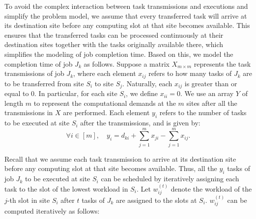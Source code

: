 To avoid the complex interaction between task transmissions and executions and simplify the problem model, we assume that every transferred task will arrive at its destination site before any computing slot at that site becomes available. %
This ensures that the transferred tasks can be processed continuously at their destination sites together with the tasks originally available there, which simplifies the modeling of job completion time. Based on this, we model the completion time of job $J_k$ as follows. Suppose a matrix $X_{m \times m}$ represents the task transmissions of job $J_k$, where each element $x_{ij}$ refers to how many tasks of $J_k$ are to be transferred from site $S_i$ to site $S_j$. Naturally, each $x_{ij}$ is greater than or equal to $0$. In particular, for each site $S_i$, we define $x_{ii}=0$. We use an array $Y$ of length $m$ to represent the computational demands at the $m$ sites after all the transmissions in $X$ are performed. Each element $y_i$ refers to the number of tasks to be executed at site $S_i$ after the transmissions, and is given by:%
\begin{equation}
    \forall i \in [m],\quad y_i = d_{ki} + \sum_{j=1}^m x_{ji} - \sum_{j=1}^m x_{ij}.
\label{eq:constraint1}
\end{equation}

Recall that we assume each task transmission to arrive at its destination site before any computing slot at that site becomes available. Thus, all the $y_i$ tasks of job $J_k$ to be executed at site $S_i$ can be scheduled by iteratively assigning each task to the slot of the lowest workload in $S_i$. Let $w_{ij}^{(t)}$ denote the workload of the $j$-th slot in site $S_i$ after $t$ tasks of $J_k$ are assigned to the slots at $S_i$. $w_{ij}^{(t)}$ can be computed iteratively as follows:%


